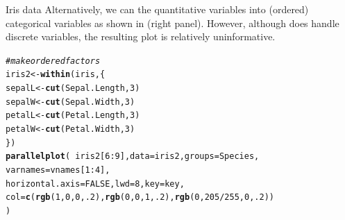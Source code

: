 \documentclass[11pt]{book}\usepackage[]{graphicx}\usepackage[]{color}
\makeatletter
\newcommand{\hlnum}[1]{\textcolor[rgb]{0.686,0.059,0.569}{#1}}%
\newcommand{\hlcom}[1]{\textcolor[rgb]{0.678,0.584,0.686}{\textit{#1}}}%
\newcommand{\hlopt}[1]{\textcolor[rgb]{0,0,0}{#1}}%
\newcommand{\hlstd}[1]{\textcolor[rgb]{0.345,0.345,0.345}{#1}}%
\newcommand{\hlkwb}[1]{\textcolor[rgb]{0.69,0.353,0.396}{#1}}%
\newcommand{\hlkwc}[1]{\textcolor[rgb]{0.333,0.667,0.333}{#1}}%
\newcommand{\hlkwd}[1]{\textcolor[rgb]{0.737,0.353,0.396}{\textbf{#1}}}%
\newenvironment{kframe}{%
 \def\at@end@of@kframe{}%
 \ifinner\ifhmode%
  \def\at@end@of@kframe{\end{minipage}}%
  \begin{minipage}{\columnwidth}%
 \fi\fi%
 \def\FrameCommand##1{\hskip\@totalleftmargin \hskip-\fboxsep
 \colorbox{shadecolor}{##1}\hskip-\fboxsep
     \hskip-\linewidth \hskip-\@totalleftmargin \hskip\columnwidth}%
 \MakeFramed {\advance\hsize-\width
   \@totalleftmargin\z@ \linewidth\hsize
   \@setminipage}}%
 {\par\unskip\endMakeFramed%
 \at@end@of@kframe}
\newenvironment{knitrout}{}{} %
\renewenvironment{knitrout}{\small\renewcommand{\baselinestretch}{.85}}{} %
\makeatother
\begin{document}
\begin{Example}[iris1]{Iris data}
Alternatively, we can  the quantitative variables into (ordered)
categorical variables as shown in  (right panel).
However, although  does handle discrete variables,
the resulting plot is relatively uninformative.
\begin{knitrout}
\color{fgcolor}\begin{kframe}
\begin{alltt}
\hlcom{# make ordered factors}
\hlstd{iris2} \hlkwb{<-} \hlkwd{within}\hlstd{(iris, \{}
   \hlstd{sepalL} \hlkwb{<-} \hlkwd{cut}\hlstd{(Sepal.Length,} \hlnum{3}\hlstd{)}
   \hlstd{sepalW} \hlkwb{<-} \hlkwd{cut}\hlstd{(Sepal.Width,} \hlnum{3}\hlstd{)}
   \hlstd{petalL} \hlkwb{<-} \hlkwd{cut}\hlstd{(Petal.Length,} \hlnum{3}\hlstd{)}
   \hlstd{petalW} \hlkwb{<-} \hlkwd{cut}\hlstd{(Petal.Width,} \hlnum{3}\hlstd{)}
   \hlstd{\})}
\hlkwd{parallelplot}\hlstd{(}\hlopt{~}\hlstd{iris2[}\hlnum{6}\hlopt{:}\hlnum{9}\hlstd{],} \hlkwc{data}\hlstd{=iris2,} \hlkwc{groups} \hlstd{= Species,}
  \hlkwc{varnames} \hlstd{= vnames[}\hlnum{1}\hlopt{:}\hlnum{4}\hlstd{],}
  \hlkwc{horizontal.axis} \hlstd{=} \hlnum{FALSE}\hlstd{,} \hlkwc{lwd}\hlstd{=}\hlnum{8}\hlstd{,} \hlkwc{key}\hlstd{=key,}
  \hlkwc{col}\hlstd{=}\hlkwd{c}\hlstd{(}\hlkwd{rgb}\hlstd{(}\hlnum{1}\hlstd{,}\hlnum{0}\hlstd{,}\hlnum{0}\hlstd{,}\hlnum{.2}\hlstd{),} \hlkwd{rgb}\hlstd{(}\hlnum{0}\hlstd{,}\hlnum{0}\hlstd{,}\hlnum{1}\hlstd{,}\hlnum{.2}\hlstd{),} \hlkwd{rgb}\hlstd{(}\hlnum{0}\hlstd{,}\hlnum{205}\hlopt{/}\hlnum{255}\hlstd{,}\hlnum{0}\hlstd{,}\hlnum{.2}\hlstd{) )}
  \hlstd{)}
\end{alltt}
\end{kframe}
\end{knitrout}



\end{Example}
\end{document}
